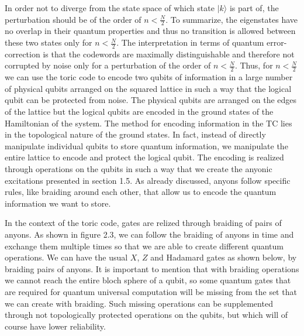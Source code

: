 \documentclass{Configuration_Files/PoliMi3i_thesis}
\begin{document}
In order not to diverge from the state space of which state $| k \rangle$  is part of, the perturbation should be of the order of $n < \frac{N}{2}$. To summarize, the eigenstates have no overlap in their quantum properties and thus no transition is allowed between these two states only for $n < \frac{N}{2}$. The interpretation in terms of quantum error-correction is that the codewords are maximally distinguishable and therefore not corrupted by noise only for a perturbation of the order of $n < \frac{N}{2}$. \newline
Thus, for $n < \frac{N}{2}$ we can use the toric code to encode two qubits of information in a large number of physical qubits arranged on the squared lattice in such a way that the logical qubit can be protected from noise. The physical qubits are arranged on the edges of the lattice but the logical qubits are encoded in the ground states of the Hamiltonian of the system. 
The method for encoding information in the TC lies in the topological nature of the ground states. In fact, instead of directly manipulate individual qubits to store quantum information, we manipulate the entire lattice to encode and protect the logical qubit. The encoding is realized through operations on the qubits in such a way that we create the anyonic excitations presented in section 1.5. As already discussed, anyons follow specific rules, like braiding around each other, that allow us to encode the quantum information we want to store.\newline 

In the context of the toric code, gates are relized through braiding of pairs of anyons. As shown in figure 2.3, we can follow the braiding of anyons in time and exchange them multiple times so that we are able to create different quantum operations. \newline
We can have the usual $X$, $Z$ and Hadamard gates as shown below, by braiding pairs of anyons. It is important to mention that with braiding operations we cannot reach the entire bloch sphere of a qubit, so some quantum gates that are required for quantum universal computation will be missing from the set that we can create with braiding. Such missing operations can be supplemented through not topologically protected operations on the qubits, but which will of course have lower reliability. \newline
\end{document}
